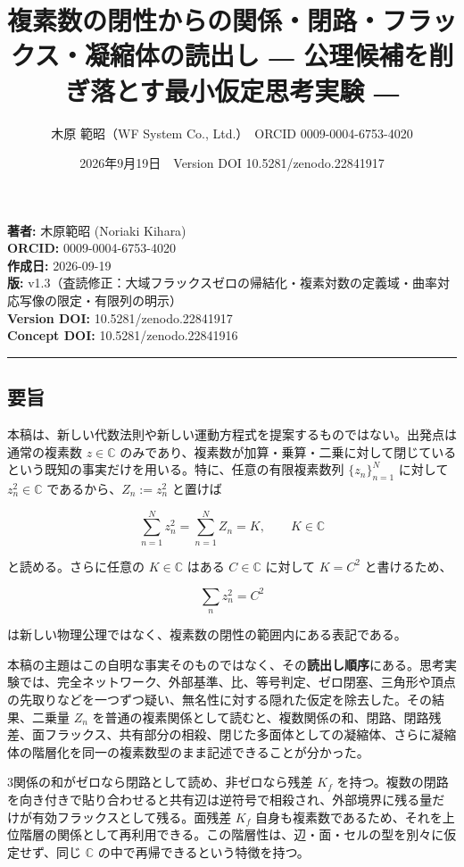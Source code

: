 \documentclass[
  a4paper,
]{ltjsarticle}
\title{複素数の閉性からの関係・閉路・フラックス・凝縮体の読出し ―
公理候補を削ぎ落とす最小仮定思考実験 ―}
\author{木原 範昭（WF System Co., Ltd.）　ORCID 0009-0004-6753-4020}
\date{2026年9月19日　Version DOI 10.5281/zenodo.22841917}
\begin{document}
\maketitle

\textbf{著者:} 木原範昭 (Noriaki Kihara)\\
\textbf{ORCID:} 0009-0004-6753-4020\\
\textbf{作成日:} 2026-09-19\\
\textbf{版:}
v1.3（査読修正：大域フラックスゼロの帰結化・複素対数の定義域・曲率対応写像の限定・有限列の明示）\\
\textbf{Version DOI:} 10.5281/zenodo.22841917\\
\textbf{Concept DOI:} 10.5281/zenodo.22841916

\begin{center}\rule{0.5\linewidth}{0.5pt}\end{center}

\subsection{要旨}\label{ux8981ux65e8}

本稿は、新しい代数法則や新しい運動方程式を提案するものではない。出発点は通常の複素数
\(z\in\mathbb C\)
のみであり、複素数が加算・乗算・二乗に対して閉じているという既知の事実だけを用いる。特に、任意の有限複素数列
\(\{z_n\}_{n=1}^{N}\) に対して \(z_n^2\in\mathbb C\)
であるから、\(Z_n:=z_n^2\) と置けば

\[
\sum_{n=1}^{N} z_n^2=\sum_{n=1}^{N} Z_n=K,\qquad K\in\mathbb C
\]

と読める。さらに任意の \(K\in\mathbb C\) はある \(C\in\mathbb C\)
に対して \(K=C^2\) と書けるため、

\[
\sum_n z_n^2=C^2
\]

は新しい物理公理ではなく、複素数の閉性の範囲内にある表記である。

本稿の主題はこの自明な事実そのものではなく、その\textbf{読出し順序}にある。思考実験では、完全ネットワーク、外部基準、比、等号判定、ゼロ閉塞、三角形や頂点の先取りなどを一つずつ疑い、無名性に対する隠れた仮定を除去した。その結果、二乗量
\(Z_n\)
を普通の複素関係として読むと、複数関係の和、閉路、閉路残差、面フラックス、共有部分の相殺、閉じた多面体としての凝縮体、さらに凝縮体の階層化を同一の複素数型のまま記述できることが分かった。

3関係の和がゼロなら閉路として読め、非ゼロなら残差 \(K_f\)
を持つ。複数の閉路を向き付きで貼り合わせると共有辺は逆符号で相殺され、外部境界に残る量だけが有効フラックスとして残る。面残差
\(K_f\)
自身も複素数であるため、それを上位階層の関係として再利用できる。この階層性は、辺・面・セルの型を別々に仮定せず、同じ
\(\mathbb C\) の中で再帰できるという特徴を持つ。
\end{document}
